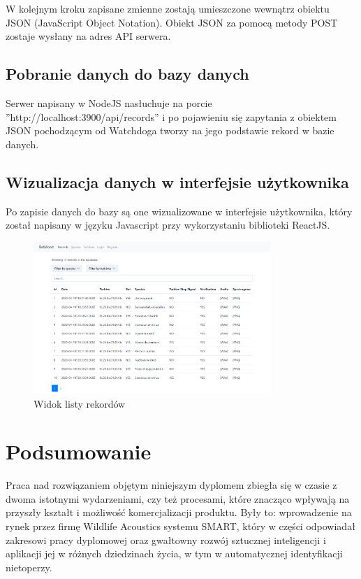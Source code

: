 \documentclass{sprz}
\begin{document}
W kolejnym kroku zapisane zmienne zostają umieszczone wewnątrz obiektu JSON (JavaScript Object Notation). Obiekt JSON za pomocą metody POST zostaje wysłany na adres API serwera.

\section{Pobranie danych do bazy danych}
Serwer napisany w NodeJS nasłuchuje na porcie ”http://localhost:3900/api/records” i po pojawieniu się zapytania z obiektem JSON pochodzącym od Watchdoga tworzy na jego podstawie rekord w bazie danych.

\section{Wizualizacja danych w interfejsie użytkownika}
Po zapisie danych do bazy są one wizualizowane w interfejsie użytkownika, który został napisany w języku Javascript przy wykorzystaniu biblioteki ReactJS.

\begin{figure}[h]
  \centering
  \includegraphics[width=0.8\textwidth]{sprz/app_records}
  \caption{Widok listy rekordów}
  \label{img:app_records}
\end{figure}

\chapter{Podsumowanie}

Praca nad rozwiązaniem objętym niniejszym dyplomem zbiegła się w czasie z dwoma istotnymi wydarzeniami, czy też procesami, które znacząco wpływają na przyszły kształt i możliwość komercjalizacji produktu. Były to: wprowadzenie na rynek przez firmę Wildlife Acoustics systemu SMART, który w części odpowiadał zakresowi pracy dyplomowej oraz gwałtowny rozwój sztucznej inteligencji i aplikacji jej w różnych dziedzinach życia, w tym w automatycznej identyfikacji nietoperzy.
\end{document}
